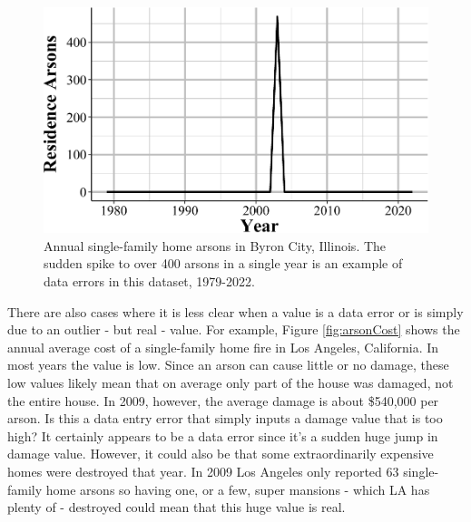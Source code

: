 \documentclass[
  12pt,
  openany]{book}
\begin{document}
\begin{figure}

{\centering \includegraphics[width=0.9\linewidth]{08_arson_files/figure-latex/residenceArson-1} 

}

\caption{Annual single-family home arsons in Byron  City, Illinois. The sudden spike to over 400 arsons in a single year is an example of data errors in this dataset, 1979-2022. }\label{fig:residenceArson}
\end{figure}

There are also cases where it is less clear when a value is a data error or is simply due to an outlier - but real - value. For example, Figure \ref{fig:arsonCost} shows the annual average cost of a single-family home fire in Los Angeles, California. In most years the value is low. Since an arson can cause little or no damage, these low values likely mean that on average only part of the house was damaged, not the entire house. In 2009, however, the average damage is about \$540,000 per arson. Is this a data entry error that simply inputs a damage value that is too high? It certainly appears to be a data error since it's a sudden huge jump in damage value. However, it could also be that some extraordinarily expensive homes were destroyed that year. In 2009 Los Angeles only reported 63 single-family home arsons so having one, or a few, super mansions - which LA has plenty of - destroyed could mean that this huge value is real.
\end{document}
